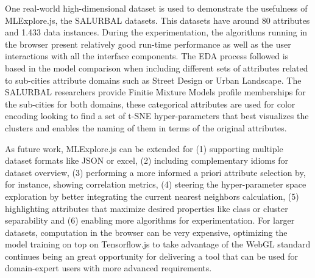 One real-world high-dimensional dataset is used to demonstrate the usefulness of MLExplore.js, the SALURBAL datasets. This datasets have around 80 attributes and 1.433 data instances. During the experimentation, the algorithms running in the browser present relatively good run-time performance as well as the user interactions with all the interface components. The EDA process followed is based in the model comparison when including different sets of attributes related to sub-cities attribute domains such as Street Design or Urban Landscape. The SALURBAL researchers provide Finitie Mixture Models profile memberships for the sub-cities for both domains, these categorical attributes are used for color encoding looking to find a set of t-SNE hyper-parameters that best visualizes the clusters and enables the naming of them in terms of the original attributes.


As future work, MLExplore.js can be extended for (1) supporting multiple dataset formats like JSON or excel, (2) including complementary idioms for dataset overview, (3) performing a more informed a priori attribute selection by, for instance, showing correlation metrics, (4) steering the hyper-parameter space exploration by better integrating the current nearest neighbors calculation, (5) highlighting attributes that maximize desired properties like class or cluster separability and (6) enabling more algorithms for experimentation. For larger datasets, computation in the browser can be very expensive, optimizing the model training on top on Tensorflow.js to take advantage of the WebGL standard continues being an great opportunity for delivering a tool that can be used for domain-expert users with more advanced requirements.